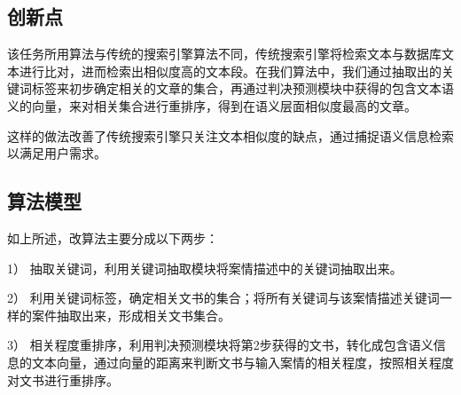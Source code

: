 \subsection{创新点}
该任务所用算法与传统的搜索引擎算法不同，传统搜索引擎将检索文本与数据库文本进行比对，进而检索出相似度高的文本段。在我们算法中，我们通过抽取出的关键词标签来初步确定相关的文章的集合，再通过判决预测模块中获得的包含文本语义的向量，来对相关集合进行重排序，得到在语义层面相似度最高的文章。

这样的做法改善了传统搜索引擎只关注文本相似度的缺点，通过捕捉语义信息检索以满足用户需求。

\subsection{算法模型}
如上所述，改算法主要分成以下两步：

1）	抽取关键词，利用关键词抽取模块将案情描述中的关键词抽取出来。

2）	利用关键词标签，确定相关文书的集合；将所有关键词与该案情描述关键词一样的案件抽取出来，形成相关文书集合。

3）	相关程度重排序，利用判决预测模块将第2步获得的文书，转化成包含语义信息的文本向量，通过向量的距离来判断文书与输入案情的相关程度，按照相关程度对文书进行重排序。



